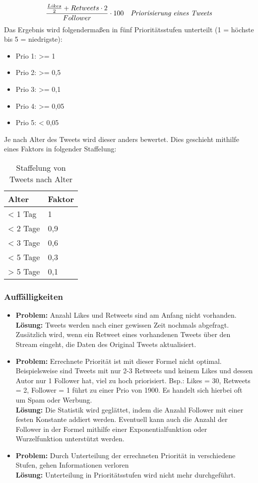 \begin{equation}
\frac{\frac{Likes}{2} + Retweets \cdot 2}{Follower} \cdot 100
\quad
\text{\textit{Priorisierung eines Tweets}}
\end{equation}
Das Ergebnis wird folgendermaßen in fünf Prioritätsstufen unterteilt (1 = höchste bis 5 = 
niedrigste):
\begin{itemize}
  \item Prio 1: >= 1
  \item Prio 2: >= 0,5
  \item Prio 3: >= 0,1
  \item Prio 4: >= 0,05
  \item Prio 5: < 0,05 
\end{itemize}
\newpage
Je nach Alter  des Tweets wird dieser anders bewertet. Dies geschieht mithilfe eines  
Faktors in folgender Staffelung: 
\begin{table}[!hb]
\centering
  \begin{tabular}{ll}
  \toprule
    \textbf{Alter} & \textbf{Faktor}  \\
    \hline
    < 1 Tag & 1 \\
    < 2 Tage & 0,9 \\
    < 3 Tage & 0,6 \\
    < 5 Tage & 0,3 \\
    > 5 Tage & 0,1 \\
    \bottomrule
  \end{tabular}
  \caption{Staffelung von Tweets nach Alter}
\end{table}
\subsubsection*{Auffälligkeiten}
\begin{itemize}
	\item \textbf{Problem:} Anzahl Likes und Retweets sind am Anfang nicht vorhanden. \\ \textbf{Lösung:} Tweets werden nach einer gewissen Zeit nochmals abgefragt. Zusätzlich wird, wenn ein Retweet eines vorhandenen Tweets über den Stream eingeht, die Daten des Original Tweets aktualisiert. 
	\item \textbf{Problem:} Errechnete Priorität ist mit dieser Formel nicht optimal. Beispielsweise sind Tweets mit nur 2-3 Retweets und keinem Likes und dessen Autor nur 1 Follower hat, viel zu hoch priorisiert. Bsp.: Likes = 30, Retweets = 2, Follower = 1 führt zu einer Prio von 1900. Es handelt sich hierbei oft um Spam oder Werbung. \\ \textbf{Lösung:} Die Statistik wird geglättet, indem die Anzahl Follower mit einer festen Konstante addiert werden. Eventuell kann auch die Anzahl der Follower in der Formel mithilfe einer Exponentialfunktion oder Wurzelfunktion unterstützt werden. 
	\item \textbf{Problem:} Durch Unterteilung der errechneten Priorität in verschiedene Stufen, gehen Informationen verloren \\ \textbf{Lösung:} Unterteilung in Prioritätsstufen wird nicht mehr durchgeführt.
\end{itemize}
    
